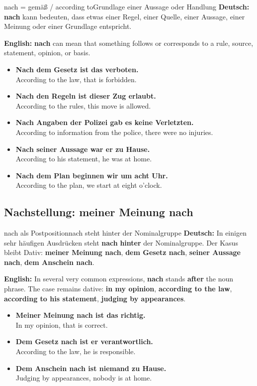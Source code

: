 \documentclass[a4paper,11pt]{article}
\newcommand{\GermanText}[1]{\textbf{Deutsch: }#1\par}
\newcommand{\EnglishText}[1]{{\small\color{SoftGray}\textbf{English: }#1\par}}
\newcommand{\ExampleItem}[2]{\item \textbf{#1}\\{\small\color{SoftGray}#2}}
\begin{document}
        \begin{grammarentry}{nach = gemäß / according to}{Grundlage einer Aussage oder Handlung}
            \GermanText{\textbf{nach} kann bedeuten, dass etwas einer Regel, einer Quelle, einer Aussage, einer Meinung oder einer Grundlage entspricht.}
            \EnglishText{\textbf{nach} can mean that something follows or corresponds to a rule, source, statement, opinion, or basis.}
        \end{grammarentry}

        \begin{exbox}
            \begin{itemize}
                \ExampleItem{Nach dem Gesetz ist das verboten.}{According to the law, that is forbidden.}
                \ExampleItem{Nach den Regeln ist dieser Zug erlaubt.}{According to the rules, this move is allowed.}
                \ExampleItem{Nach Angaben der Polizei gab es keine Verletzten.}{According to information from the police, there were no injuries.}
                \ExampleItem{Nach seiner Aussage war er zu Hause.}{According to his statement, he was at home.}
                \ExampleItem{Nach dem Plan beginnen wir um acht Uhr.}{According to the plan, we start at eight o'clock.}
            \end{itemize}
        \end{exbox}

        \subsection{Nachstellung: meiner Meinung nach}

        \begin{grammarentry}{nach als Postposition}{nach steht hinter der Nominalgruppe}
            \GermanText{In einigen sehr häufigen Ausdrücken steht \textbf{nach} \textbf{hinter} der Nominalgruppe. Der Kasus bleibt Dativ: \textbf{meiner Meinung nach}, \textbf{dem Gesetz nach}, \textbf{seiner Aussage nach}, \textbf{dem Anschein nach}.}
            \EnglishText{In several very common expressions, \textbf{nach} stands \textbf{after} the noun phrase. The case remains dative: \textbf{in my opinion}, \textbf{according to the law}, \textbf{according to his statement}, \textbf{judging by appearances}.}
        \end{grammarentry}

        \begin{exbox}
            \begin{itemize}
                \ExampleItem{Meiner Meinung nach ist das richtig.}{In my opinion, that is correct.}
                \ExampleItem{Dem Gesetz nach ist er verantwortlich.}{According to the law, he is responsible.}
                \ExampleItem{Dem Anschein nach ist niemand zu Hause.}{Judging by appearances, nobody is at home.}
            \end{itemize}
        \end{exbox}
\end{document}
